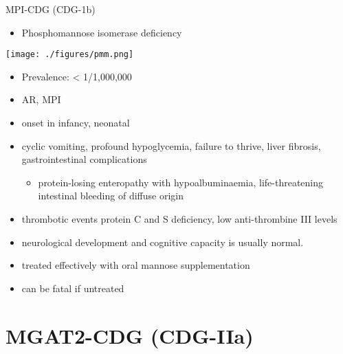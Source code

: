 \documentclass[presentation, smaller]{beamer}
\begin{document}
\begin{frame}[label={sec:org96ec884}]{MPI-CDG (CDG-1b)}
\begin{itemize}
\item Phosphomannose isomerase deficiency
\end{itemize}
\begin{center}
\texttt{[image: ./figures/pmm.png]}
\end{center}

\begin{itemize}
\item Prevalence: \textless{} 1/1,000,000
\item AR, MPI
\item onset in infancy, neonatal

\item cyclic vomiting, profound hypoglycemia, failure to thrive, liver
fibrosis, gastrointestinal complications
\begin{itemize}
\item protein-losing enteropathy with hypoalbuminaemia, life-threatening
intestinal bleeding of diffuse origin
\end{itemize}
\item thrombotic events protein C and S deficiency, low anti-thrombine III levels
\item neurological development and cognitive capacity is usually normal.
\item treated effectively with oral mannose supplementation
\item can be fatal if untreated
\end{itemize}
\end{frame}

\section{MGAT2-CDG (CDG-IIa)}
\label{sec:org54c6d3c}
\end{document}
